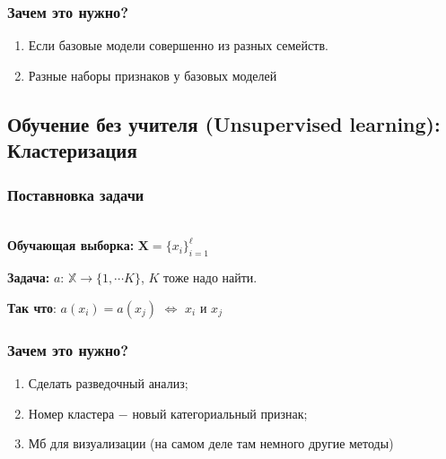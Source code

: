     \subsubsection{Зачем это нужно?}
        \begin{enumerate}
            \item Если базовые модели совершенно из разных семейств.

            \item Разные наборы признаков у базовых моделей
        \end{enumerate}

    \subsection{Обучение без учителя (Unsupervised learning): Кластеризация}

        \subsubsection{Поставновка задачи}

            \\
            
            \textbf{Обучающая выборка:} \quad $\mathbf{X} = \{x_i \}_{i = 1}^\ell$
            \begin{center}
                \textbf{Задача:} \quad\quad $a$: \quad $\mathbb{X} \longrightarrow \{1, \cdots K\}$, \quad $K$ тоже надо найти.
            \end{center}

            \begin{center}
                \textbf{Так что}: \quad $a(x_i) = a(x_j)$ $\Longleftrightarrow$ $x_i$ и $x_j$ 
            \end{center}


        \subsubsection{Зачем это нужно?}

            \begin{enumerate}
                \item Сделать разведочный анализ;
                \item Номер кластера $-$ новый категориальный признак;
                \item Мб для визуализации (на самом деле там немного другие методы)
            \end{enumerate}


